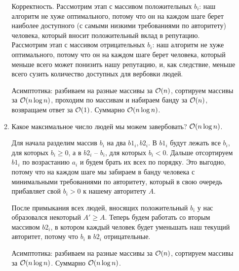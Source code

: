 \begin{enumerate}
\begin{enumerate}
\begin{solution}
            Корректность. Рассмотрим этап с массивом положительных $b_i$: наш алгоритм не хуже оптимального, потому что он на каждом шаге берет наиболее доступного (с самыми низкими требованиями по авторитету) человека, который вносит положительный вклад в репутацию. Рассмотрим этап с массивом отрицательных $b_i$: наш алгоритм не хуже оптимального, потому что он на каждом шаге берет человека, который меньше всего может понизить нашу репутацию, и, как следствие, меньше всего сузить количество доступных для вербовки людей.

            Асимптотика: разбиваем на разные массивы за $\mathcal{O}(n)$, сортируем массивы за $\mathcal{O}(n \log n)$, проходим по массивам и набираем банду за $\mathcal{O}(n)$, возвращаем ответ за $\mathcal{O}(1)$. Суммарно $\mathcal{O}(n \log n)$.
        \end{solution}

		\item Какое максимальное число людей мы можем завербовать? $\mathcal{O}(n \log n)$.
		
        \begin{solution}
            Для начала разделим массив $b_i$ на два $b1_i, b2_i$. В $b1_i$ будут лежать все $b_i$, для которых $b_i \geq 0$, а в $b2_i$ -- $b_i$, для которых $b_i < 0$. Дальше отсортируем $b1_i$ по возрастанию $a_i$ и будем брать их всех по порядку. Это выгодно, потому что на каждом шаге мы забираем в банду человека с минимальными требованиями по авторитету, который в свою очередь прибавляет свой $b_i > 0$ к нашему авторитету $A$.

            После примыкания всех людей, вносящих положительный $b_i$ у нас образовался некоторый $A' \geq A$. Теперь будем работать со вторым массивом $b2_i$, в котором каждый человек будет уменьшать наш текущий авторитет, потому что $b_i$ в $b2_i$ отрицательные.



            Асимптотика: разбиваем на разные массивы за $\mathcal{O}(n)$, сортируем массивы за $\mathcal{O}(n \log n)$. Суммарно $\mathcal{O}(n \log n)$.
        \end{solution}
	\end{enumerate}





\end{enumerate}
